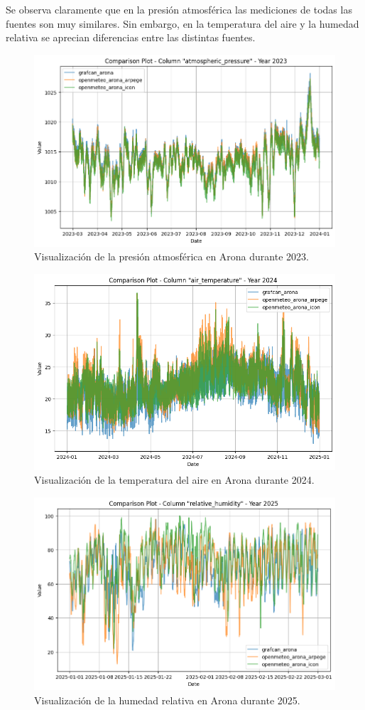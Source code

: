 Se observa claramente que en la presión atmosférica las mediciones de todas las fuentes son muy similares. Sin embargo, 
en la temperatura del aire y la humedad relativa se aprecian diferencias entre las distintas fuentes.
\begin{figure}
    \centering
    \includegraphics[width=.8\linewidth]{images/visualizacion_1.png}
    \caption{Visualización de la presión atmosférica en Arona durante 2023.}
    \label{visualizacion_1}
\end{figure}
\begin{figure}
    \centering
    \includegraphics[width=.8\linewidth]{images/visualizacion_2.png}
    \caption{Visualización de la temperatura del aire en Arona durante 2024.}
    \label{visualizacion_2}
\end{figure}
\begin{figure}
    \centering
    \includegraphics[width=.8\linewidth]{images/visualizacion_3.png}
    \caption{Visualización de la humedad relativa en Arona durante 2025.}
    \label{visualizacion_3}
\end{figure}

